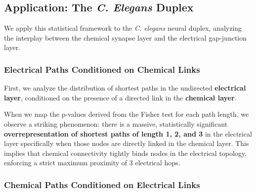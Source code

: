 \subsection{Application: The \textit{C. Elegans} Duplex}
\label{subsec:celegans_path_association}

We apply this statistical framework to the \textit{C. elegans} neural duplex, analyzing the interplay between the chemical synapse layer and the electrical gap-junction layer.

\subsubsection{Electrical Paths Conditioned on Chemical Links}
\label{subsubsec:electrical_conditioned_chemical}

First, we analyze the distribution of shortest paths in the undirected \textbf{electrical layer}, conditioned on the presence of a directed link in the \textbf{chemical layer}.



When we map the p-values derived from the Fisher test for each path length, we observe a striking phenomenon: there is a massive, statistically significant \textbf{overrepresentation of shortest paths of length 1, 2, and 3} in the electrical layer specifically when those nodes are directly linked in the chemical layer. This implies that chemical connectivity tightly binds nodes in the electrical topology, enforcing a strict maximum proximity of 3 electrical hops.

\subsubsection{Chemical Paths Conditioned on Electrical Links}
\label{subsubsec:chemical_conditioned_electrical}


